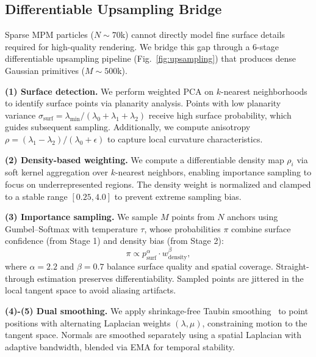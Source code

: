\subsection{Differentiable Upsampling Bridge}
\label{sec:upsampling}

    Sparse MPM particles ($N{\sim}70$k) cannot directly model fine surface details required for high-quality rendering. We bridge this gap through a 6-stage differentiable upsampling pipeline (Fig.~\ref{fig:upsampling}) that produces dense Gaussian primitives ($M{\sim}500$k).
    
    \textbf{(1) Surface detection.} 
    We perform weighted PCA on $k$-nearest neighborhoods to identify surface points via planarity analysis. Points with low planarity variance $\sigma_{\text{surf}} = \lambda_{\min}/(\lambda_0{+}\lambda_1{+}\lambda_2)$ receive high surface probability, which guides subsequent sampling. Additionally, we compute anisotropy $\rho = (\lambda_1 - \lambda_2)/(\lambda_0 + \epsilon)$ to capture local curvature characteristics.
    
    \textbf{(2) Density-based weighting.} 
    We compute a differentiable density map $\rho_i$ via soft kernel aggregation over $k$-nearest neighbors, enabling importance sampling to focus on underrepresented regions. The density weight is normalized and clamped to a stable range $[0.25, 4.0]$ to prevent extreme sampling bias.
    
    \textbf{(3) Importance sampling.} 
    We sample $M$ points from $N$ anchors using Gumbel--Softmax with temperature $\tau$, whose probabilities $\pi$ combine surface confidence (from Stage 1) and density bias (from Stage 2):
    \begin{equation}
    \pi \propto p_{\text{surf}}^\alpha \cdot w_{\text{density}}^\beta,
    \end{equation}
    where $\alpha=2.2$ and $\beta=0.7$ balance surface quality and spatial coverage. Straight-through estimation preserves differentiability. Sampled points are jittered in the local tangent space to avoid aliasing artifacts.
    
    \textbf{(4)-(5) Dual smoothing.} 
    We apply shrinkage-free Taubin smoothing~\cite{taubin1995signal} to point positions with alternating Laplacian weights $(\lambda, \mu)$, constraining motion to the tangent space. Normals are smoothed separately using a spatial Laplacian with adaptive bandwidth, blended via EMA for temporal stability.
    
